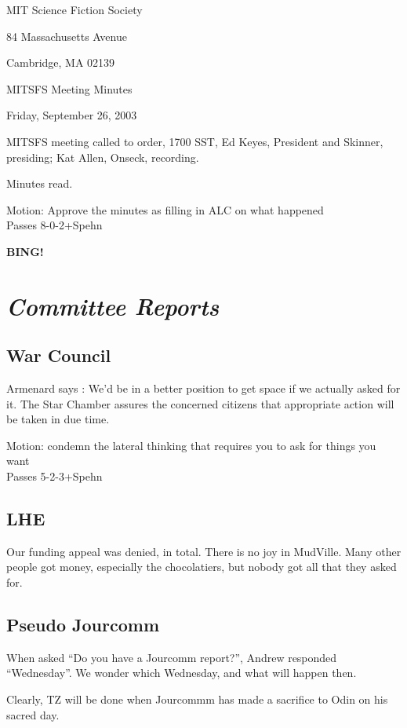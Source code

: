 \documentclass[10pt]{article}
\newcommand{\bing}{{\bf BING!} }
\newcommand{\goto}[1]{\bing \vskip 12pt \section*{{\em{#1}}}}
\begin{document}
\begin{center}

MIT Science Fiction Society 

84 Massachusetts Avenue

Cambridge, MA 02139

\vspace{12pt}

MITSFS Meeting Minutes 

Friday, September 26, 2003

\end{center}
 
\vspace{18pt}

\setlength{\parskip}{6pt}

\noindent
MITSFS meeting called to order, 1700 SST, Ed Keyes, President and
Skinner, presiding; Kat Allen,  Onseck, recording.

Minutes read.

Motion: Approve the minutes as filling in ALC on what happened\\
Passes 8-0-2+Spehn

\goto{Committee Reports}
\subsection*{War Council }
Armenard says : We'd be in a better position to get space if we
actually asked for it.  The Star Chamber assures the concerned
citizens that appropriate action will be taken in due time.

Motion: condemn the lateral thinking that requires you to ask for
things you want\\
Passes 5-2-3+Spehn

\subsection*{LHE}
Our funding appeal was denied, in total.  There is no joy in MudVille.
Many other people got money, especially the chocolatiers, but nobody
got all that they asked for.

\subsection*{Pseudo Jourcomm}
When asked ``Do you have a Jourcomm report?'', Andrew responded ``Wednesday''.
We wonder which Wednesday, and what will happen then.

Clearly, TZ will be done when Jourcommm has made a sacrifice to Odin
on his sacred day.
\end{document}
